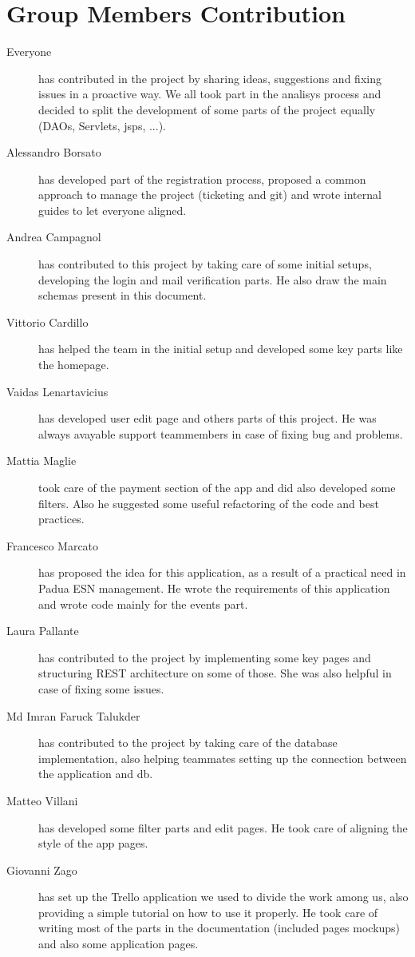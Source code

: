 \section{Group Members Contribution}

\begin{description}
	\item[Everyone] has contributed in the project by sharing ideas, suggestions and fixing issues in a proactive way. We all took part in the analisys process and decided to split the development of some parts of the project equally (DAOs, Servlets, jsps, ...). 
	\item[Alessandro Borsato] has developed part of the registration process, proposed a common approach to manage the project (ticketing and git) and wrote internal guides to let everyone aligned.
	\item[Andrea Campagnol] has contributed to this project by taking care of some initial setups, developing the login and mail verification parts. He also draw the main schemas present in this document.
	\item[Vittorio Cardillo] has helped the team in the initial setup and developed some key parts like the homepage.
	\item[Vaidas Lenartavicius] has developed user edit page and others parts of this project. He was always avayable support teammembers in case of fixing bug and problems.
	\item[Mattia Maglie] took care of the payment section of the app and did also developed some filters. Also he suggested some useful refactoring of the code and best practices.
	\item[Francesco Marcato] has proposed the idea for this application, as a result of a practical need in Padua ESN management. He wrote the requirements of this application and wrote code mainly for the events part.
	\item[Laura Pallante] has contributed to the project by implementing some key pages and structuring REST architecture on some of those. She was also helpful in case of fixing some issues.
	\item[Md Imran Faruck Talukder] has contributed to the project by taking care of the database implementation, also helping teammates setting up the connection between the application and db.
	\item[Matteo Villani] has developed some filter parts and edit pages. He took care of aligning the style of the app pages.
	\item[Giovanni Zago] has set up the Trello application we used to divide the work among us, also providing a simple tutorial on how to use it properly. He took care of writing most of the parts in the documentation (included pages mockups) and also some application pages.
\end{description}